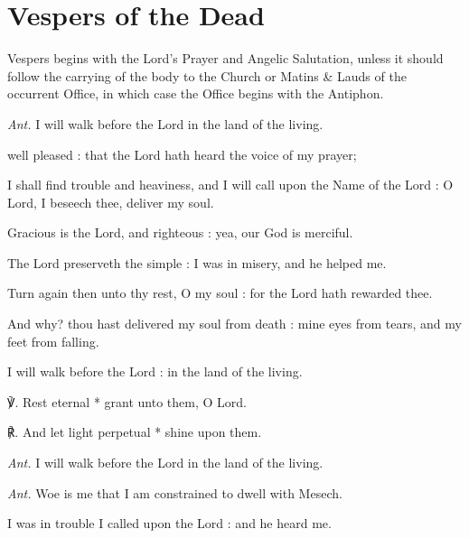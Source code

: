\section{Vespers of the Dead}
\begin{rubric}
Vespers begins with the Lord's Prayer and Angelic Salutation, unless it should follow the carrying of the body to the Church or Matins \& Lauds of the occurrent Office, in which case the Office begins with the Antiphon.
\end{rubric}
\par\noindent
\textit{Ant.} I will walk {\dag} before the Lord in the land of the living.\par
{} well pleased : that the Lord hath heard the voice of my prayer;\par
{}
I shall find trouble and heaviness, and I will call upon the Name of the Lord : O Lord, I beseech thee, deliver my soul.\par
{}Gracious is the Lord, and righteous : yea, our God is merciful.\par
{}The Lord preserveth the simple : I was in misery, and he helped me.\par
{}Turn again then unto thy rest, O my soul : for the Lord hath rewarded thee.\par
{}And why? thou hast delivered my soul from death : mine eyes from tears, and my feet from falling.\par
{}I will walk before the Lord : in the land of the living.
\par
℣. Rest eternal * grant unto them, O Lord.\par
℟. And let light perpetual * shine upon them.\par\noindent
\textit{Ant.} I will walk before the Lord in the land of the living.
\par\noindent
\textit{Ant.} Woe is me {\dag} that I am constrained to dwell with Mesech.\par
{} I was in trouble I called upon the Lord : and he heard me.\par
{}
